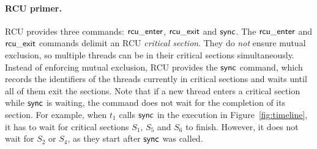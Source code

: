 \paragraph{RCU primer.}
RCU provides three commands: ${\sf rcu\_enter}$, ${\sf rcu\_exit}$ and
${\sf sync}$. The ${\sf rcu\_enter}$ and ${\sf rcu\_exit}$ commands delimit an RCU {\em critical
  section}. They do {\em not} ensure mutual exclusion, so multiple
threads can be in their critical sections simultaneously. Instead of enforcing
mutual exclusion, RCU provides the ${\sf sync}$ command, which records the
identifiers of the threads currently in critical sections and waits until all of
them exit the sections. Note that if a new thread enters a critical section
while ${\sf sync}$ is waiting, the command does not wait for the completion of its
section. For example, when $t_1$ calls ${\sf sync}$ in the execution in
Figure~\ref{fig:timeline}, it has to wait for critical sections $S_1$, $S_5$ and
$S_6$ to finish. However, it does not wait for %
$S_2$ or $S_4$, as they
start after ${\sf sync}$ was called.


